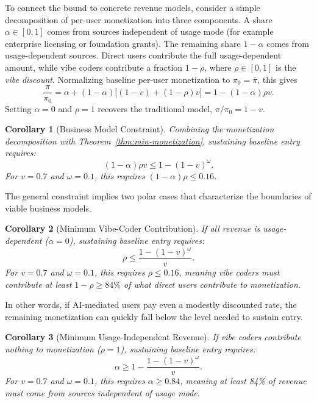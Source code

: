 \documentclass[11pt,a4paper]{article}
\newtheorem{corollary}{Corollary}
\theoremstyle{definition}
\theoremstyle{remark}
\begin{document}
To connect the bound to concrete revenue models, consider a simple decomposition of per-user monetization into three components. A share $\alpha \in [0,1]$ comes from sources independent of usage mode (for example enterprise licensing or foundation grants). The remaining share $1-\alpha$ comes from usage-dependent sources. Direct users contribute the full usage-dependent amount, while vibe coders contribute a fraction $1-\rho$, where $\rho \in [0,1]$ is the \emph{vibe discount}. Normalizing baseline per-user monetization to $\pi_0=\bar\pi$, this gives
$$
\frac{\pi}{\pi_0} = \alpha + (1-\alpha)\bigl[(1-v) + (1-\rho)v\bigr] = 1 - (1-\alpha)\rho v.
$$
Setting $\alpha=0$ and $\rho=1$ recovers the traditional model, $\pi/\pi_0 = 1-v$.

\begin{corollary}[Business Model Constraint]\label{cor:bm-constraint}
Combining the monetization decomposition with Theorem~\ref{thm:min-monetization}, sustaining baseline entry requires:
$$
(1-\alpha)\rho v \leq 1 - (1-v)^\omega.
$$
For $v = 0.7$ and $\omega = 0.1$, this requires $(1-\alpha)\rho \leq 0.16$.
\end{corollary}

The general constraint implies two polar cases that characterize the boundaries of viable business models.

\begin{corollary}[Minimum Vibe-Coder Contribution]\label{cor:min-vibe-contribution}
If all revenue is usage-dependent ($\alpha = 0$), sustaining baseline entry requires:
$$
\rho \leq \frac{1 - (1-v)^\omega}{v}.
$$
For $v = 0.7$ and $\omega = 0.1$, this requires $\rho \leq 0.16$, meaning vibe coders must contribute at least $1 - \rho \geq 84\%$ of what direct users contribute to monetization.
\end{corollary}

In other words, if AI-mediated users pay even a modestly discounted rate, the remaining monetization can quickly fall below the level needed to sustain entry.

\begin{corollary}[Minimum Usage-Independent Revenue]\label{cor:min-fixed-revenue}
If vibe coders contribute nothing to monetization ($\rho = 1$), sustaining baseline entry requires:
$$
\alpha \geq 1 - \frac{1 - (1-v)^\omega}{v}.
$$
For $v = 0.7$ and $\omega = 0.1$, this requires $\alpha \geq 0.84$, meaning at least 84\% of revenue must come from sources independent of usage mode.
\end{corollary}
\end{document}
